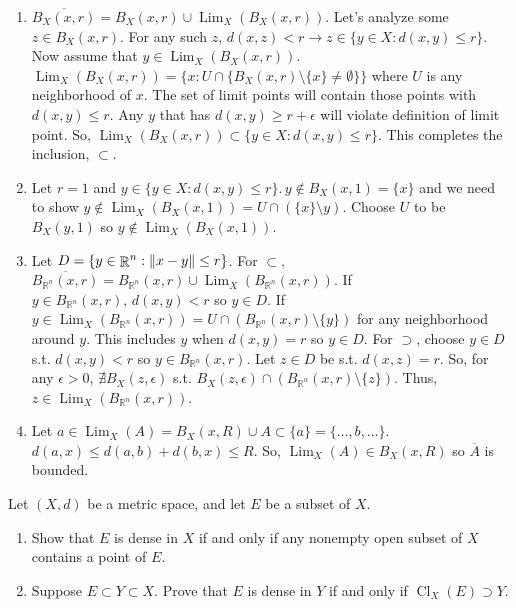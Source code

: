\documentclass[12pt,letterpaper,boxed]{hmcpset}
\DeclareMathOperator{\Lim}{Lim}
\DeclareMathOperator{\Cl}{Cl}
\DeclareMathOperator{\R}{\mathbb{R}}
\DeclarePairedDelimiter{\norm}{\lVert}{\rVert}
\begin{document}
\begin{solution}
\vspace{-2mm}
	\begin{enumerate}
		\itemsep0em
		\item $\overline{B_X(x,r)} = B_X(x, r) \cup \Lim_X(B_X(x, r)).$ Let's analyze some $z \in B_X(x, r)$. For any such $z$, $d(x, z) < r \rightarrow z \in \{y \in X : d(x,y) \leq r\}$. Now assume that $y \in \Lim_X(B_X(x, r)).$ $\Lim_X(B_X(x,r)) = \{x : U \cap \{ B_X(x,r)\setminus\{x\}\neq \emptyset \}\}$ where $U$ is any neighborhood of $x$. The set of limit points will contain those points with $d(x,y) \leq r.$ Any $y$ that has $d(x, y) \ge r + \epsilon$ will violate definition of limit point. So, $\Lim_X(B_X(x,r)) \subset \{y \in X : d(x,y) \leq r\}$. This completes the inclusion, $\subset$.
		\item Let $r = 1$ and $y \in \{y \in X : d(x, y) \leq r\}. \,y \notin B_X(x, 1)=\{x\}$ and we need to show $y \notin \Lim_X(B_X(x, 1)) = U\cap (\{x\}\setminus y).$ Choose $U$ to be $B_X(y,1)$ so $y \notin \Lim_X(B_X(x,1))$.
		\item Let $D = \{y \in \R^{n} : \norm{x - y} \leq r\}$. For $\subset,$ $\overline{B_{\R^{n}}(x,r)} = B_{\R^{n}}(x,r) \cup \Lim_X(B_{\R^{n}}(x,r)).$ If $y \in B_{\R^{n}}(x,r), \, d(x, y) < r$ so $y \in D.$ If $y \in \Lim_X(B_{\R^{n}}(x,r)) = U\cap(B_{\R^{n}}(x,r)\setminus\{y\})$ for any neighborhood around $y$. This includes $y$ when $d(x, y) = r$ so $y \in D.$ For $\supset$, choose $y \in D$ s.t. $d(x,y)<r$ so $y \in B_{\R^{n}}(x,r)$. Let $z \in D$ be s.t. $d(x, z) = r$. So, for any $\epsilon > 0$, $\nexists B_X(z, \epsilon)$ s.t. $B_X(z, \epsilon)\cap(B_{\R^{n}}(x,r)\setminus\{z\}).$ Thus, $z \in \Lim_X(B_{\R^{n}}(x,r))$.
		\item Let $a \in \Lim_X(A) = B_X(x,R)\cup A \subset \{ a\}= \{\dots, b, \dots\}$. $d(a, x) \leq d(a, b) + d(b, x) \leq R.$ So, $\Lim_X(A)\in B_X(x,R)$ so $\overline{A}$ is bounded.
	\end{enumerate}
\end{solution}


\begin{problem}[Exercise 1.30]
Let $(X, d)$ be a metric space, and let $E$ be a subset of $X$. 
	\vspace{-2mm}
	\begin{enumerate}
		\itemsep0em
		\item Show that $E$ is dense in $X$ if and only if any nonempty open subset of $X$ contains a point of $E$.
		\item Suppose $E\subset Y\subset X.$ Prove that $E$ is dense in $Y$ if and only if $\Cl_X(E) \supset Y$.
	\end{enumerate}
\end{problem}
\end{document}
